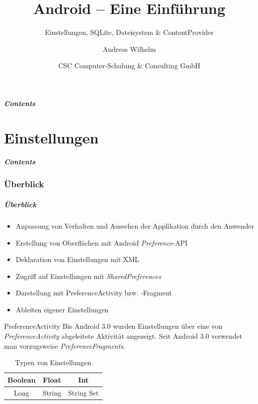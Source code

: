 \title{Android -- Eine Einführung}
\subtitle{Einstellungen, SQLite, Dateisystem \& ContentProvider}
\author[A. Wilhelm]{Andreas Wilhelm}
\titlegraphic{}
\date{CSC Computer-Schulung \& Consulting GmbH}

\begin{frame}[plain]
  \titlepage
\end{frame}

\section[Contents]{}
\begin{frame}
	\frametitle{Contents}
	\tableofcontents[onlyparts]
\end{frame}

\part{Einstellungen}
\frame{\partpage}
\begin{frame}
	\frametitle{Contents}
	\tableofcontents[]
\end{frame}

\section{Überblick}
\begin{frame}
   \frametitle{Überblick}
   \begin{itemize}
      \item Anpassung von Verhalten und Aussehen der Applikation durch den 
         Anwender
      \item Erstellung von Oberflächen mit Android \emph{Preference}-API 
      \item Deklaration von Einstellungen mit XML
      \item Zugriff auf Einstellungen mit \emph{SharedPreferences}
      \item Darstellung mit PreferenceActivity bzw. -Fragment
      \item Ableiten eigener Einstellungen
   \end{itemize}

   \begin{alertblock}{PreferenceActivity}
      Bis Android 3.0 wurden Einstellungen über eine von \emph{PreferenceActivity} 
      abgeleitete Aktivität angezeigt. Seit Android 3.0 verwendet man 
      vorzugsweise \emph{PreferenceFragments}.
   \end{alertblock}

   \begin{table}[t]
      \begin{center}
         \begin{tabular}{c|c|c}
            Boolean & Float & Int\\
            \hline
            Long & String & String Set\\
         \end{tabular}
         \label{tab:preference_types}
         \caption{Typen von Einstellungen}
      \end{center}
   \end{table}
\end{frame}

